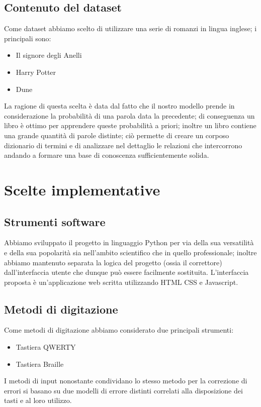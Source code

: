 \documentclass[a4paper,11pt]{article}
\begin{document}
  \subsection{Contenuto del dataset}
    Come dataset abbiamo scelto di utilizzare una serie di romanzi in lingua inglese; i principali sono:
    \begin{itemize}
     \item Il signore degli Anelli
     \item Harry Potter
     \item Dune
    \end{itemize}
    La ragione di questa scelta è data dal fatto che il nostro modello prende in considerazione
    la probabilità di una parola data la precedente; di conseguenza un libro è ottimo per apprendere queste probabilità a priori; inoltre
    un libro contiene una grande quantità di parole distinte; ciò permette di creare un corposo dizionario di termini e di analizzare nel
    dettaglio le relazioni che intercorrono andando a formare una base di conoscenza sufficientemente solida.
\newpage
\section{Scelte implementative}
	\subsection{Strumenti software}
    	Abbiamo sviluppato il progetto in linguaggio Python per via della sua versatilità e della sua popolarità sia nell'ambito scientifico che in quello
        professionale; inoltre abbiamo mantenuto separata la logica del progetto (ossia il correttore) dall'interfaccia utente che dunque può essere 
        facilmente sostituita. L'interfaccia proposta è un'applicazione web scritta utilizzando HTML CSS e Javascript.
        
	\subsection{Metodi di digitazione}
    	Come metodi di digitazione abbiamo considerato due principali strumenti: 
        \begin{itemize}
        	\item Tastiera QWERTY
            \item Tastiera Braille
        \end{itemize}
		I metodi di input nonostante condividano lo stesso metodo per la correzione di errori si basano su due modelli di errore
        distinti correlati alla disposizione dei tasti e al loro utilizzo.
\end{document}
